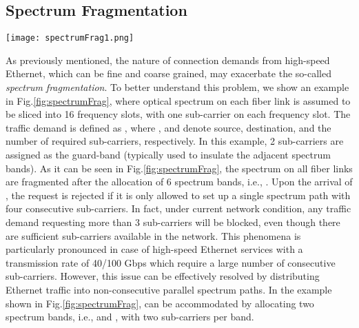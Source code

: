 \documentclass[conference]{IEEEtran}
\begin{document}
 \subsection{Spectrum Fragmentation}
 \begin{figure*}[ht]
	\centering
		\texttt{[image: spectrumFrag1.png]}
	\caption{An illustrative example of spectrum fragmentation and a solution with two non-consequitve spectrum slices} \vspace{-0.3cm}	\label{fig:spectrumFrag}
\end{figure*}
\par As previously mentioned, the nature of connection demands from high-speed Ethernet, which can be fine and 
coarse grained, may exacerbate the so-called \emph{spectrum fragmentation}. To better understand this problem,  we 
show an  example  in Fig.\ref{fig:spectrumFrag}, where optical spectrum on each fiber link is assumed to be  sliced 
into 16 frequency slots, with one sub-carrier on each frequency slot.  The traffic demand is defined as  , 
where ,  and  denote source, destination, and the number of required  sub-carriers, respectively. In this 
example, 2 sub-carriers are assigned as the guard-band (typically used to insulate the adjacent spectrum bands).  As it 
can be seen in Fig.\ref{fig:spectrumFrag}, the spectrum  on all fiber links are  fragmented after the allocation of 6 
spectrum bands, i.e., .  
 Upon the arrival of , the   request is rejected  if it is only allowed to set up a single spectrum path with four consecutive 
 sub-carriers. In fact, under current network condition, any traffic demand requesting more than 3 sub-carriers will be 
 blocked, even  though there are sufficient sub-carriers available in the network. This phenomena is particularly 
 pronounced in case of  high-speed Ethernet services  with a transmission rate of   40/100 Gbps which require  a large 
 number of consecutive sub-carriers. However, this issue can be effectively resolved by  distributing Ethernet 
 traffic into non-consecutive parallel spectrum paths.    In the example shown in Fig.\ref{fig:spectrumFrag},  can 
 be accommodated by allocating two spectrum bands, i.e.,  and , with two sub-carriers per band.
 

 

       
           



 
 
 
\end{document}
